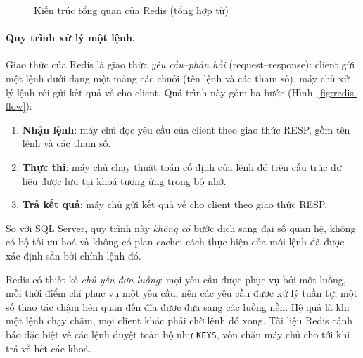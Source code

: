 \begin{figure}[H]
    \centering
    \caption{Kiến trúc tổng quan của Redis (tổng hợp từ)}
    \label{fig:redis-arch}
\end{figure}

\paragraph{Quy trình xử lý một lệnh.}
Giao thức của Redis là giao thức \textit{yêu cầu--phản hồi} (request--response): client gửi một lệnh dưới dạng một mảng các chuỗi (tên lệnh và các tham số), máy chủ xử lý lệnh rồi gửi kết quả về cho client. Quá trình này gồm ba bước (Hình~\ref{fig:redis-flow}):
\begin{enumerate}
    \item \textbf{Nhận lệnh}: máy chủ đọc yêu cầu của client theo giao thức RESP, gồm tên lệnh và các tham số.
    \item \textbf{Thực thi}: máy chủ chạy thuật toán cố định của lệnh đó trên cấu trúc dữ liệu được lưu tại khoá tương ứng trong bộ nhớ.
    \item \textbf{Trả kết quả}: máy chủ gửi kết quả về cho client theo giao thức RESP.
\end{enumerate}
So với SQL Server, quy trình này \textit{không có} bước dịch sang đại số quan hệ, không có bộ tối ưu hoá và không có plan cache: cách thực hiện của mỗi lệnh đã được xác định sẵn bởi chính lệnh đó.

Redis có thiết kế \textit{chủ yếu đơn luồng}: mọi yêu cầu được phục vụ bởi một luồng, mỗi thời điểm chỉ phục vụ một yêu cầu, nên các yêu cầu được xử lý tuần tự; một số thao tác chậm liên quan đến đĩa được đưa sang các luồng nền. Hệ quả là khi một lệnh chạy chậm, mọi client khác phải chờ lệnh đó xong. Tài liệu Redis cảnh báo đặc biệt về các lệnh duyệt toàn bộ như \texttt{KEYS}, vốn chặn máy chủ cho tới khi trả về hết các khoá.

